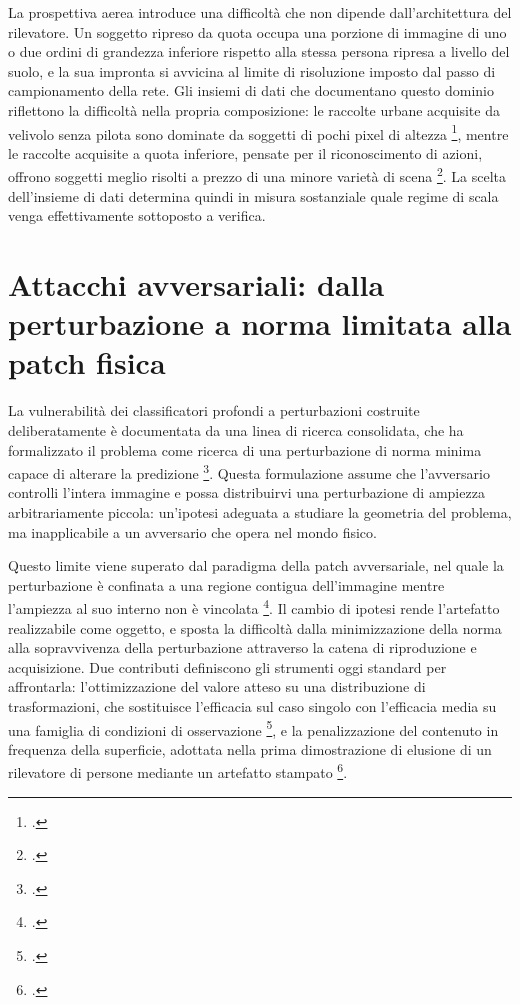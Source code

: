 \ifstampa\documentclass[a4paper,12pt,twoside,openright]{report}\else\documentclass[a4paper,12pt]{report}\fi
\newif\ifrevisione \revisionefalse
\DeclareRobustCommand{\rev}[1]{\ifrevisione{\color{blue!65!black}#1}\else#1\fi}
\begin{document}
La prospettiva aerea introduce una difficoltà che non dipende dall'architettura
del rilevatore. Un soggetto ripreso da quota occupa una porzione di immagine di
uno o due ordini di grandezza inferiore rispetto alla stessa persona ripresa a
livello del suolo, e la sua impronta si avvicina al limite di risoluzione
imposto dal passo di campionamento della rete. Gli insiemi di dati che
documentano questo dominio riflettono la difficoltà nella propria composizione:
le raccolte urbane acquisite da velivolo senza pilota sono dominate da soggetti
di pochi pixel di altezza \footcite{zhu_2021_visdrone}, mentre le raccolte
acquisite a quota inferiore, pensate per il riconoscimento di azioni, offrono
soggetti meglio risolti a prezzo di una minore varietà di scena
\footcite{barekatain_2017_okutama}. La scelta dell'insieme di dati determina
quindi in misura sostanziale quale regime di scala venga effettivamente
sottoposto a verifica.

\section{Attacchi avversariali: dalla perturbazione a norma limitata alla patch fisica}
\label{sec:sota_adversarial}

La vulnerabilità dei classificatori profondi a perturbazioni costruite
deliberatamente è documentata da una linea di ricerca consolidata, che ha
formalizzato il problema come ricerca di una perturbazione di norma minima
capace di alterare la predizione \footcite{carlini_2017}. Questa formulazione
assume che l'avversario controlli l'intera immagine e possa distribuirvi una
perturbazione di ampiezza arbitrariamente piccola: un'ipotesi adeguata a
studiare la geometria del problema, ma inapplicabile a un avversario che opera
nel mondo fisico.

Questo limite viene superato dal paradigma della patch avversariale, nel quale
la perturbazione è confinata a una regione contigua dell'immagine mentre
l'ampiezza al suo interno non è vincolata \footcite{brown_2017_patch}. Il
cambio di ipotesi rende l'artefatto realizzabile come oggetto, e sposta la
difficoltà dalla minimizzazione della norma alla sopravvivenza della
perturbazione attraverso la catena di riproduzione e acquisizione. Due
contributi definiscono gli strumenti oggi standard per affrontarla:
l'ottimizzazione del valore atteso su una distribuzione di trasformazioni, che
sostituisce l'efficacia sul caso singolo con l'efficacia media su una famiglia di
condizioni di osservazione \footcite{athalye_2018_eot}, e la penalizzazione del
contenuto in frequenza della superficie, \rev{adottata nella prima}
dimostrazione di elusione di un rilevatore di persone mediante un artefatto
stampato \footcite{thys_2019}.
\end{document}
